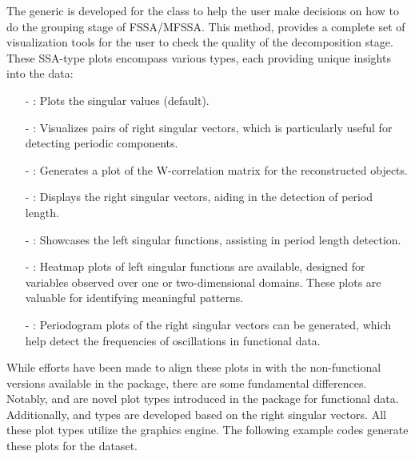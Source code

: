 The generic  is developed for the  class to help the user make decisions on how to do the grouping stage of FSSA/MFSSA. This method, provides a complete set of visualization tools for the user to check the quality of the decomposition stage.  These SSA-type plots encompass various types, each providing unique insights into the data:
\begin{itemize}
	\item[-] \textbf{}: Plots the singular values (default).
	\item[-] \textbf{}: Visualizes pairs of right singular vectors, which is particularly useful for detecting periodic components.
	\item[-] \textbf{}: Generates a plot of the W-correlation matrix for the reconstructed objects.
	\item[-] \textbf{}: Displays the right singular vectors, aiding in the detection of period length.
	\item[-] \textbf{}: Showcases the left singular functions, assisting in period length detection.
	\item[-] \textbf{}: Heatmap plots of left singular functions are available, designed for  variables observed over one or two-dimensional domains. These plots are valuable for identifying meaningful patterns.
	\item[-] \textbf{}: Periodogram plots of the right singular vectors can be generated, which help detect the frequencies of oscillations in functional data.
\end{itemize}
While efforts have been made to align these plots in  with the non-functional versions available in the  package, there are some fundamental differences. Notably,  and   are novel plot types introduced in the  package for functional data. Additionally,  and   types are developed based on the right singular vectors. All these plot types utilize the  graphics engine. The following example codes generate these plots for the  dataset.

